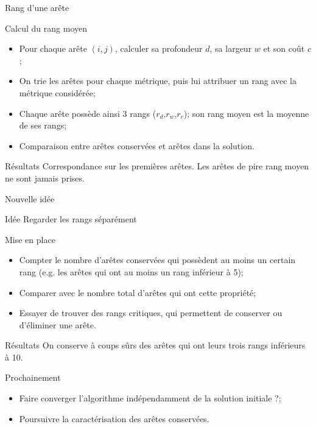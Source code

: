 \documentclass{beamer}
\begin{document}
\begin{frame}{Rang d'une arête}
\begin{block}{Calcul du rang moyen}
\begin{itemize}
\item Pour chaque arête $(i,j)$, calculer sa profondeur $d$, sa largeur $w$ et son coût $c$;
\item On trie les arêtes pour chaque métrique, puis lui attribuer un rang avec la métrique considérée;
\item Chaque arête possède ainsi $3$ rangs ($r_d$,$r_w$,$r_c$); son rang moyen est la moyenne de ses rangs;
\item Comparaison entre arêtes conservées et arêtes dans la solution.
\end{itemize}
\end{block}

\begin{exampleblock}{Résultats}
Correspondance sur les premières arêtes. Les arêtes de pire rang moyen ne sont jamais prises.
\end{exampleblock}
\end{frame}

\begin{frame}{Nouvelle idée}
\begin{alertblock}{Idée}
Regarder les rangs séparément
\end{alertblock}

\begin{block}{Mise en place}
\begin{itemize}
\item Compter le nombre d'arêtes conservées qui possèdent au moins un certain rang (e.g. les arêtes qui ont au moins un rang inférieur à 5);
\item Comparer avec le nombre total d'arêtes qui ont cette propriété;
\item Essayer de trouver des rangs critiques, qui permettent de conserver ou d'éliminer une arête.
\end{itemize}
\end{block}

\begin{exampleblock}{Résultats}
On conserve à coups sûrs des arêtes qui ont leurs trois rangs inférieurs à 10.
\end{exampleblock}

\end{frame}

\begin{frame}{Prochainement}

\begin{itemize}
\item Faire converger l'algorithme indépendamment de la solution initiale ?;
\item Poursuivre la caractérisation des arêtes conservées.
\end{itemize}

\end{frame}
\end{document}
